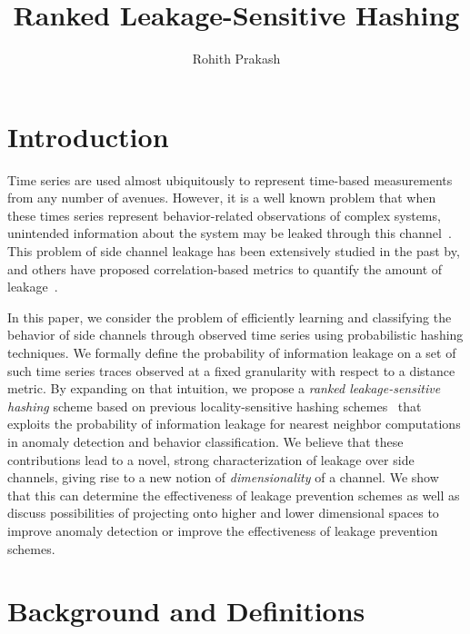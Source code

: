 \documentclass[a4paper]{article}
\title{Ranked Leakage-Sensitive Hashing}
\author{Rohith Prakash}
\date{}
\begin{document}
\maketitle{}

\section{Introduction}
\label{sec:intro}

Time series are used almost ubiquitously to represent time-based measurements from any number of avenues.
However, it is a well known problem that when these times series represent behavior-related observations of complex systems, unintended information about the system may be leaked through this channel~\cite{DBLP:conf/ccs/RistenpartTSS09,DBLP:conf/sp/ZhangJOR11}.
This problem of side channel leakage has been extensively studied in the past by, and others have proposed correlation-based metrics to quantify the amount of leakage~\cite{demme2012,zhang2013}.

In this paper, we consider the problem of efficiently learning and classifying the behavior of side channels through observed time series using probabilistic hashing techniques.
We formally define the probability of information leakage on a set of such time series traces observed at a fixed granularity with respect to a distance metric.
By expanding on that intuition, we propose a \textit{ranked leakage-sensitive hashing} scheme based on previous locality-sensitive hashing schemes~\cite{Kulis12-KLSH,Jiang15-KLSH,Kim16-SLSH} that exploits the probability of information leakage for nearest neighbor computations in anomaly detection and behavior classification.
We believe that these contributions lead to a novel, strong characterization of leakage over side channels, giving rise to a new notion of \textit{dimensionality} of a channel.
We show that this can determine the effectiveness of leakage prevention schemes as well as discuss possibilities of projecting onto higher and lower dimensional spaces to improve anomaly detection or improve the effectiveness of leakage prevention schemes.

\section{Background and Definitions}
\label{sec:definitions}

%
\end{document}
